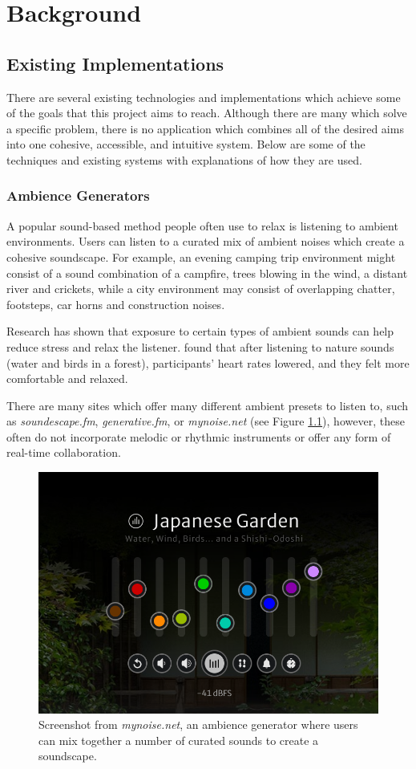 \chapter{Background}

\section{Existing Implementations}

There are several existing technologies and implementations which achieve some of the goals that this project aims to reach. Although there are many which solve a specific problem, there is no application which combines all of the desired aims into one cohesive, accessible, and intuitive system. Below are some of the techniques and existing systems with explanations of how they are used.

\subsection{Ambience Generators}
A popular sound-based method people often use to relax is listening to ambient environments. Users can listen to a curated mix of ambient noises which create a cohesive soundscape. For example, an evening camping trip environment might consist of a sound combination of a campfire, trees blowing in the wind, a distant river and crickets, while a city environment may consist of overlapping chatter, footsteps, car horns and construction noises.

Research has shown that exposure to certain types of ambient sounds can help reduce stress and relax the listener. \cite{song2023effects} found that after listening to nature sounds (water and birds in a forest), participants’ heart rates lowered, and they felt more comfortable and relaxed.

There are many sites which offer many different ambient presets to listen to, such as \textit{soundescape.fm}, \textit{generative.fm}, or \textit{mynoise.net} (see Figure \ref{fig:mynoise}), however, these often do not incorporate melodic or rhythmic instruments or offer any form of real-time collaboration.

\begin{figure}[htb]
    \centering
    \includegraphics[width=0.5\linewidth]{images/background/mynoise.png}    

    \caption{Screenshot from \textit{mynoise.net}, an ambience generator where users can mix together a number of curated sounds to create a soundscape.}

    \label{fig:mynoise}

\end{figure}

